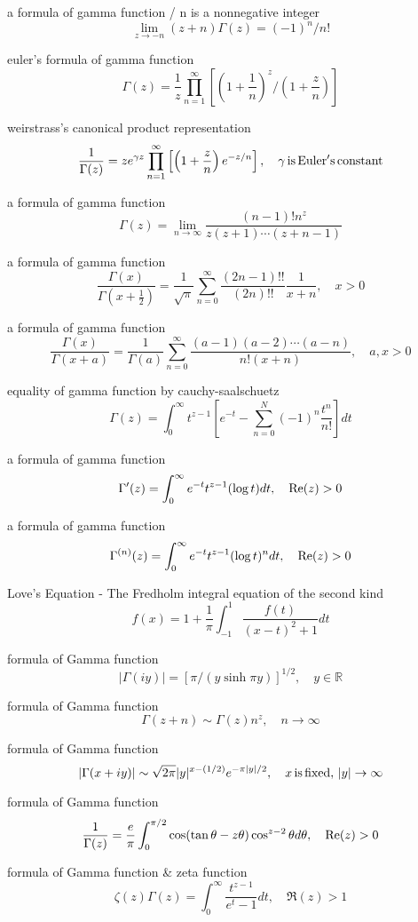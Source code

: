 a formula of gamma function / n is a nonnegative integer  
$$
\lim_{z\rightarrow -n}(z+n)\Gamma(z)=(-1)^n/n!
$$

euler’s formula of gamma function
$$
\Gamma(z)=\frac{1}{z}\prod^\infty_{n=1}\left[\left(1+\frac{1}{n}\right)^z \Big/ \left(1+\frac{z}{n}\right)\right]
$$

weirstrass’s canonical product representation
$$
\frac{1}{\Gamma(z)}=z e^{\gamma z}\prod^\infty_{n=1}\left[\left(1+\frac{z}{n}\right)e^{-z/n}\right], \quad \gamma \, {\rm is} \, {\rm Euler's} \, {\rm constant}
$$

a formula of gamma function
$$
\Gamma(z)=\lim_{n\rightarrow\infty}\frac{(n-1)!n^z}{z(z+1)\cdots(z+n-1)}
$$

a formula of gamma function
$$
\frac{\Gamma(x)}{\Gamma(x+\frac{1}{2})}=\frac{1}{\sqrt{\pi}}\sum^\infty_{n=0}\frac{(2n-1)!!}{(2n)!!}\frac{1}{x+n}, \quad x>0
$$

a formula of gamma function
$$
\frac{\Gamma(x)}{\Gamma(x+a)}=\frac{1}{\Gamma(a)}\sum^\infty_{n=0}\frac{(a-1)(a-2)\cdots(a-n)}{n!(x+n)}, \quad a,x>0
$$

equality of gamma function by cauchy-saalschuetz
$$
\Gamma(z)=\int^\infty_0 t^{z-1}\left[e^{-t}-\sum^N_{n=0}(-1)^n\frac{t^n}{n!}\right]dt
$$

a formula of gamma function
$$
\Gamma'(z)=\int^\infty_0 e^{-t}t^{z-1}(\log t)dt, \quad {\rm Re}(z)>0
$$

a formula of gamma function
$$
\Gamma^{(n)}(z)=\int^\infty_0 e^{-t}t^{z-1}(\log t)^n dt, \quad {\rm Re}(z)>0
$$

Love's Equation - The Fredholm integral equation of the second kind
$$
f(x)=1+\frac{1}{\pi}\int^1_{-1}\frac{f(t)}{(x-t)^2+1}dt
$$

formula of Gamma function 
$$
\left| \Gamma(i y) \right|=\left[\pi \big/(y \sinh \pi y)\right]^{1/2}, \quad y\in{\mathbb R}
$$

formula of Gamma function 
$$
\Gamma(z+n) \sim \Gamma(z)n^z, \quad n\rightarrow\infty
$$

formula of Gamma function
$$
\left|\Gamma(x+iy)\right|\sim\sqrt{2\pi}|y|^{x-(1/2)}e^{-\pi |y|/2}, \quad x\,{\rm is}\,{\rm fixed}, \, |y|\rightarrow\infty
$$

formula of Gamma function
$$
\frac{1}{\Gamma(z)}=\frac{e}{\pi}\int^{\pi/2}_0\cos(\tan\theta-z\theta)\cos^{z-2}\theta d\theta,\quad {\rm Re}(z)>0
$$

formula of Gamma function & zeta function
$$
\zeta(z)\Gamma(z)=\int^\infty_0\frac{t^{z-1}}{e^t-1}dt, \quad {\Re}(z)>1
$$

